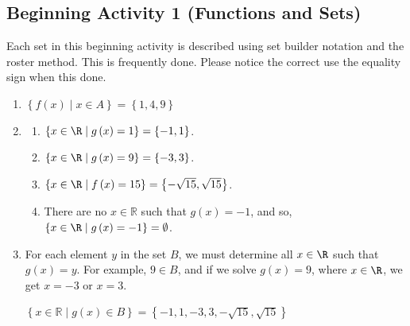 \documentclass[11pt]{article}
\begin{document}
\subsection*{Beginning Activity 1 (Functions and Sets)}
Each set in this beginning activity is described using set builder notation and the roster method.  This is frequently done.  Please notice the correct use the equality sign when this done.
\begin{enumerate}
%



%
%
%
\item $\left\{ f \left( x \right) \mid x \in A \right\} = \left\{ 1, 4, 9 \right\}$

\item \begin{enumerate}
\item $\left\{ x \in \R \mid g\left( x \right) = 1 \right\} = \left\{ -1, 1 \right\}$.
\item $\left\{ x \in \R \mid g\left( x \right) = 9 \right\} = \left\{ -3, 3 \right\}$.
\item $\left\{ x \in \R \mid f\left( x \right) = 15 \right\} = \left\{ -\sqrt{15}, \sqrt{15} \right\}$.

\item There are no $x \in \mathbb{R}$ such that $g \left( x \right) = -1$, and so,
$\left\{ x \in \R \mid g\left( x \right) = -1 \right\} = \emptyset$.
\end{enumerate}

\item For each element $y$ in the set $B$, we must determine all $x \in \R$ such that $g(x) = y$.  For example, $9 \in B$, and if we solve $g(x) = 9$, where $x \in \R$, we get $x = -3$ or $x = 3$.

$\left\{ x \in \mathbb{R} \mid g \left( x \right) \in B \right\} = \left\{ -1, 1, -3, 3, 
-\sqrt{15}, \sqrt{15} \right\}$

\end{enumerate}
\end{document}
